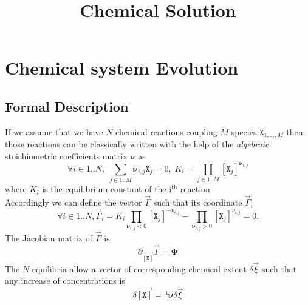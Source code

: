 \documentclass[aps,twocolumn]{revtex4}
\newcommand{\myconc}[1]{\left\lbrack #1 \right\rbrack}
\newcommand{\mychem}[1]{{\mathtt{#1}}}
\newcommand{\species}{\mychem{X}}
\newcommand{\mymat}[1]{\boldsymbol{#1}}
\newcommand{\mytrn}[1]{{\!\!~^{\mathsf{t}}{#1}}}
\newcommand{\myvec}[1]{\overrightarrow{#1}}
\newcommand{\vecX}{\myvec{\myconc{\mychem{X}}}}
\begin{document}
\title{Chemical Solution}


\maketitle

\section{Chemical system Evolution}
\subsection{Formal Description}
If we assume that we have $N$ chemical reactions coupling $M$ species $\species_{1,\ldots,M}$ then those reactions can be classically written with the help
of the \textit{algebraic} stoichiometric coefficients matrix $\mymat{\nu}$ as
\begin{equation}
	\label{eq:Ki}
	\forall i \in 1..N, \; \sum_{j\in1..M} \mymat{\nu}_{i,j} \species_j = 0, \; K_i=\prod_{j\in1..M} \myconc{\species_j}^{\mymat{\nu}_{i,j}}
\end{equation}
where $K_i$ is the equilibrium constant of the i$^{\text{th}}$ reaction\\
Accordingly we can define the vector $\vec{\Gamma}$ such that its coordinate $\vec{\Gamma}_i$
\begin{equation}
	\label{eq:Gamma}
	\forall i \in 1..N, \vec{\Gamma}_i = K_i \prod_{\mymat{\nu}_{i,j}<0} \myconc{\species_j}^{-\nu_{i,j}} - \prod_{\mymat{\nu}_{i,j}>0} \myconc{\species_j}^{\nu_{i,j}} = 0.
\end{equation}
The Jacobian matrix of $\vec{\Gamma}$ is
\begin{equation}
	\partial_{\vecX} \vec{\Gamma} = \mymat{\Phi}
\end{equation}
The $N$ equilibria allow a vector of corresponding chemical extent $\delta\vec{\xi}$ such that any increase of concentrations is
\begin{equation}
	\delta\vecX = \mytrn{\mymat{\nu}} \delta\vec{\xi}
\end{equation}
\end{document}

